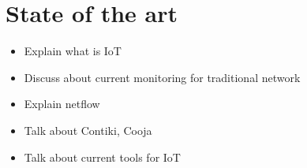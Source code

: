 \chapter{State of the art} \label{ch:state_art}

\begin{itemize}
	\item Explain what is IoT
	\item Discuss about current monitoring for traditional network
	\item Explain netflow
	\item Talk about Contiki, Cooja
	\item Talk about current tools for IoT
\end{itemize}
